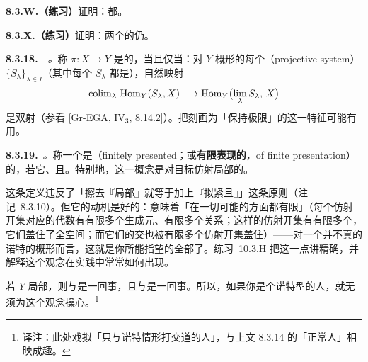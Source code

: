 \textbf{8.3.W.（练习）}\quad 证明：\trOpenEmbedding{}都\trLocally\trFinitelyPresented。

\textbf{8.3.X.（练习）}\quad 证明：两个\trLocally\trFinitelyPresented{}\trMorphism{}的\trComposition{}仍\trLocally\trFinitelyPresented。

\textbf{8.3.18.}\ \extrahard\ \emph{\trhRemark{}。}\quad 称\trMorphism{} $\pi\colon X\to Y$ 是\trLocally\trFinitelyPresented{}的，当且仅当：对 $Y$-概形的每个\trProjectiveSystem{}（projective system）$\{S_\lambda\}_{\lambda\in I}$（其中每个 $S_\lambda$ 都是\trAffineScheme），自然映射
\[
\operatorname{colim}_{\lambda}\,\operatorname{Hom}_Y(S_\lambda,X)\longrightarrow\operatorname{Hom}_Y\bigl(\underset{\lambda}{\lim}\,S_\lambda,\,X\bigr)
\]
是双射（参看 [Gr-EGA, IV$_3$, 8.14.2]）。把\trLocally\trFinitelyPresented{}\trMorphism{}刻画为「保持极限」的这一特征可能有用。

\textbf{8.3.19.}\ \emph{\trhDefinition{}。}\quad 称一个\trMorphism{}是\textbf{\trFinitelyPresented}（finitely presented；或\textbf{有限表现的}，of finite presentation）的，若它\trLocally\trFinitelyPresented、\trQuasicompact{}且\trQuasiSeparated。特别地，\trFinitelyPresented{}\trMorphism{}这一概念是对目标仿射局部的。

这条定义违反了「擦去『局部』就等于加上『拟紧且』」这条原则（注记~8.3.10）。但它的动机是好的：\trFinitelyPresented{}意味着「在一切可能的方面都有限」（每个仿射开集对应的代数有有限多个生成元、有限多个关系；这样的仿射开集有有限多个，它们盖住了全空间；而它们的交也被有限多个仿射开集盖住）——对一个并不真的诺特的概形而言，这就是你所能指望的全部了。\mbox{练习~10.3.H} 把这一点讲精确，并解释这个观念在实践中常常如何出现。

若 $Y$ 局部\trNoetherian，则\trLocally\trFinitelyPresented{}与\trLocally\trFiniteType{}是一回事，且\trFinitelyPresented{}与\trFiniteType{}是一回事。所以，如果你是个诺特型的人，就无须为这个观念操心。\footnote{译注：此处戏拟「只与诺特情形打交道的人」，与上文 8.3.14 的「正常人」相映成趣。}
